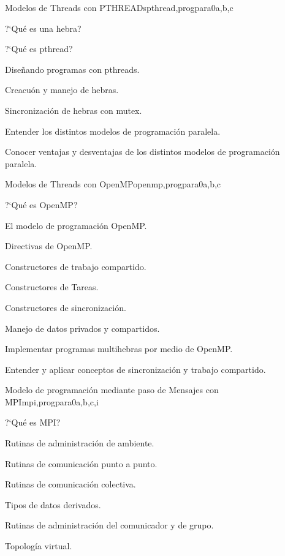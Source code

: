 \begin{syllabus}
\begin{unit}{Modelos de Threads con PTHREADs}{pthread,progpara}{0}{a,b,c}
\begin{topics}
         \item ?`Qué es una hebra?
         \item ?`Qué es  pthread?
         \item Diseñando programas con pthreads.
         \item Creacuón y manejo de hebras.
         \item Sincronización de hebras con mutex.
\end{topics}

\begin{unitgoals}
	\item Entender los distintos modelos de programación paralela.
	\item Conocer ventajas y desventajas de los distintos modelos de programación paralela.
\end{unitgoals}
\end{unit}

\begin{unit}{Modelos de Threads con OpenMP}{openmp,progpara}{0}{a,b,c}
\begin{topics}
         \item ?`Qué es OpenMP?
         \item El modelo de programación OpenMP.
         \item Directivas de OpenMP.
         \item Constructores de trabajo compartido.
         \item Constructores de Tareas.
         \item Constructores de sincronización.
	 \item Manejo de datos privados y compartidos.
\end{topics}

\begin{unitgoals}
	\item Implementar programas multihebras por medio de OpenMP.
	\item Entender y aplicar conceptos de sincronización y trabajo compartido.
\end{unitgoals}
\end{unit}

\begin{unit}{Modelo de programación mediante paso de Mensajes con MPI}{mpi,progpara}{0}{a,b,c,i}
\begin{topics}
         \item ?`Qué es MPI?
         \item Rutinas de administración de ambiente.
         \item Rutinas de comunicación punto a punto.
         \item Rutinas de comunicación colectiva.
         \item Tipos de datos derivados.
         \item Rutinas de administración del comunicador y de grupo.
	 \item Topología virtual.
\end{topics}


\end{unit}
\end{syllabus}
